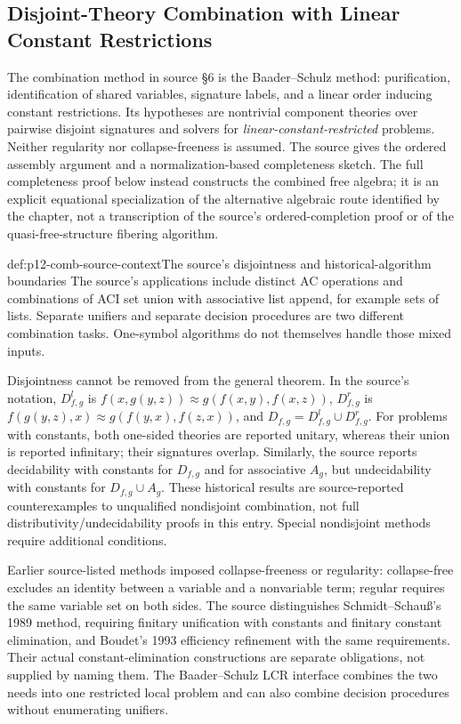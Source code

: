 \subsection{Disjoint-Theory Combination with Linear Constant Restrictions}
\label{sec:p12-equational-combination}

The combination method in source \S6 is the Baader--Schulz method:
purification, identification of shared variables, signature labels, and a
linear order inducing constant restrictions. Its hypotheses are nontrivial
component theories over pairwise disjoint signatures and solvers for
\emph{linear-constant-restricted} problems. Neither regularity nor
collapse-freeness is assumed. The source gives the ordered assembly
argument and a normalization-based completeness sketch. The full
completeness proof below instead constructs the combined free algebra;
it is an explicit equational specialization of the alternative algebraic
route identified by the chapter, not a transcription of the source's
ordered-completion proof or of the quasi-free-structure fibering algorithm.
\cite[\S6, pp.~513--519]{BaaderSnyder2001}
\cite[author manuscript \S\S4.2--4.4, pp.~26--35]{BaaderSchulz1998Combination}

\begin{hbwarning}{def:p12-comb-source-context}{The source's disjointness and historical-algorithm boundaries}
The source's applications include distinct AC operations and combinations
of ACI set union with associative list append, for example sets of
lists. Separate unifiers and separate decision procedures are two
different combination tasks. One-symbol algorithms do not themselves
handle those mixed inputs.

Disjointness cannot be removed from the general theorem. In the source's
notation, \(D^l_{f,g}\) is
\(f(x,g(y,z))\approx g(f(x,y),f(x,z))\),
\(D^r_{f,g}\) is
\(f(g(y,z),x)\approx g(f(y,x),f(z,x))\), and
\(D_{f,g}=D^l_{f,g}\cup D^r_{f,g}\).
For problems with constants, both one-sided theories are reported
unitary, whereas their union is reported infinitary; their signatures
overlap. Similarly, the source reports decidability with constants for
\(D_{f,g}\) and for associative \(A_g\), but undecidability with
constants for \(D_{f,g}\cup A_g\). These historical results
are source-reported counterexamples to unqualified nondisjoint
combination, not full distributivity/undecidability proofs in this entry.
Special nondisjoint methods require additional conditions.
\cite[\S3.4 and p.~513]{BaaderSnyder2001}

Earlier source-listed methods imposed collapse-freeness or regularity:
collapse-free excludes an identity between a variable and a nonvariable
term; regular requires the same variable set on both sides. The source
distinguishes Schmidt--Schau\ss's 1989 method, requiring finitary
unification with constants and finitary constant elimination, and
Boudet's 1993 efficiency refinement with the same requirements.
Their actual constant-elimination constructions are separate obligations,
not supplied by naming them. The Baader--Schulz LCR interface combines
the two needs into one restricted local problem and can also combine
decision procedures without enumerating unifiers.
\cite[p.~514]{BaaderSnyder2001}
\end{hbwarning}

